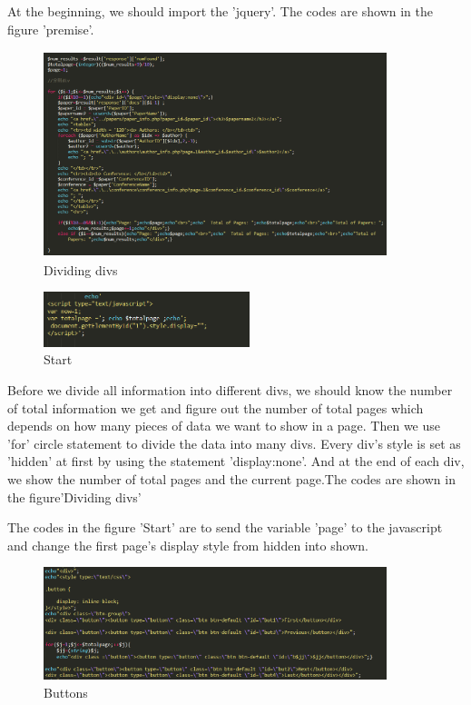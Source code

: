 \documentclass{book}
\begin{document}
At the beginning, we should import the 'jquery'. The codes are shown in the figure 'premise'.


\begin{figure}[H]
\centering
\includegraphics[height=6.0cm,width=10.0cm]{img/dsw_divide.png}
\caption{Dividing divs}
\end{figure}


\begin{figure}[H]
\centering
\includegraphics[width=6.0cm]{img/dsw_3.png}
\caption{Start}
\end{figure}


Before we divide all information into different divs, we should know the number of total information we get and figure out the number of total pages which depends on how many pieces of data we want to show in a page. Then we use 'for' circle statement to divide the data into many divs. Every div's
style is set as 'hidden' at first by using the statement 'display:none'. And at the end of each div, we show the number of total pages and the current page.The codes are shown in the figure'Dividing divs'

The codes in the figure 'Start' are to send the variable 'page' to the javascript and change the first page's display style from hidden into shown.

\begin{figure}[H]
\centering
\includegraphics[width=10.0cm]{img/dsw_button.png}
\caption{Buttons}
\end{figure}
\end{document}
